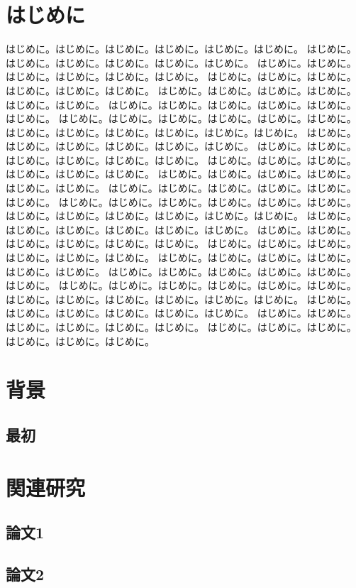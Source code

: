 \documentclass[a4paper,12pt]{jreport}
\begin{document}
\chapter{はじめに}
はじめに。はじめに。はじめに。はじめに。はじめに。はじめに。
はじめに。はじめに。はじめに。はじめに。はじめに。はじめに。
はじめに。はじめに。はじめに。はじめに。はじめに。はじめに。
はじめに。はじめに。はじめに。はじめに。はじめに。はじめに。
はじめに。はじめに。はじめに。はじめに。はじめに。はじめに。
はじめに。はじめに。はじめに。はじめに。はじめに。はじめに。
はじめに。はじめに。はじめに。はじめに。はじめに。はじめに。
はじめに。はじめに。はじめに。はじめに。はじめに。はじめに。
はじめに。はじめに。はじめに。はじめに。はじめに。はじめに。
はじめに。はじめに。はじめに。はじめに。はじめに。はじめに。
はじめに。はじめに。はじめに。はじめに。はじめに。はじめに。
はじめに。はじめに。はじめに。はじめに。はじめに。はじめに。
はじめに。はじめに。はじめに。はじめに。はじめに。はじめに。
はじめに。はじめに。はじめに。はじめに。はじめに。はじめに。
はじめに。はじめに。はじめに。はじめに。はじめに。はじめに。
はじめに。はじめに。はじめに。はじめに。はじめに。はじめに。
はじめに。はじめに。はじめに。はじめに。はじめに。はじめに。
はじめに。はじめに。はじめに。はじめに。はじめに。はじめに。
はじめに。はじめに。はじめに。はじめに。はじめに。はじめに。
はじめに。はじめに。はじめに。はじめに。はじめに。はじめに。
はじめに。はじめに。はじめに。はじめに。はじめに。はじめに。
はじめに。はじめに。はじめに。はじめに。はじめに。はじめに。
はじめに。はじめに。はじめに。はじめに。はじめに。はじめに。
はじめに。はじめに。はじめに。はじめに。はじめに。はじめに。
はじめに。はじめに。はじめに。はじめに。はじめに。はじめに。

\chapter{背景}
\section{最初}

\chapter{関連研究}
\section{論文1}
\section{論文2}
\end{document}
